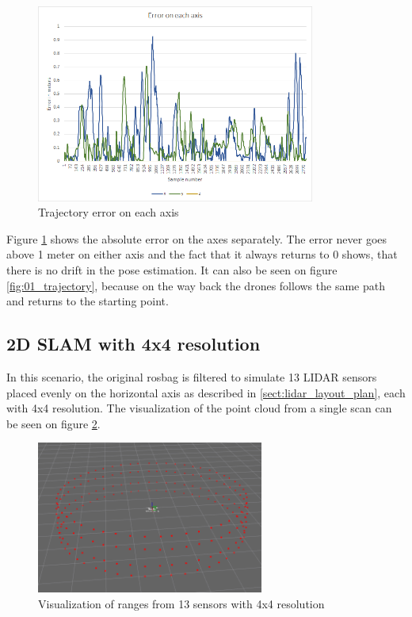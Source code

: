 \begin{figure}[!h]
    \centering
	\includegraphics[height=65mm, keepaspectratio]{figures/01_trajectory_error.png}
    \caption{Trajectory error on each axis}
    \label{fig:01_trajectory_error}
\end{figure}

Figure \ref{fig:01_trajectory_error} shows the absolute error on the axes separately. The error 
never goes above 1 meter on either axis and the fact that it always returns to 0 shows,
that there is no drift in the pose estimation. It can also be seen on figure 
\ref{fig:01_trajectory}, because on the way back the drones follows the same path
and returns to the starting point.

\subsection{2D SLAM with 4x4 resolution}
In this scenario, the original rosbag is filtered to simulate 13 LIDAR sensors placed
evenly on the horizontal axis as described in \ref{sect:lidar_layout_plan}, each with
4x4 resolution. The visualization of the point cloud from a single scan can be seen on
figure \ref{fig:02_lidar_layout}.

\begin{figure}[!h]
    \centering
	\includegraphics[height=50mm, keepaspectratio]{figures/02_lidar_layout.png}
    \caption{Visualization of ranges from 13 sensors with 4x4 resolution}
    \label{fig:02_lidar_layout}
\end{figure}

